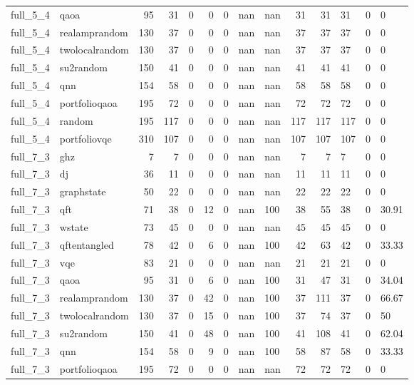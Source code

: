 \begin{longtable}{llrrrrlllrrlll}
full\_5\_4 & qaoa & 95 & 31 & 0 & 0 & 0 & nan & nan & 31 & 31 & 31 & 0 & 0 \\
full\_5\_4 & realamprandom & 130 & 37 & 0 & 0 & 0 & nan & nan & 37 & 37 & 37 & 0 & 0 \\
full\_5\_4 & twolocalrandom & 130 & 37 & 0 & 0 & 0 & nan & nan & 37 & 37 & 37 & 0 & 0 \\
full\_5\_4 & su2random & 150 & 41 & 0 & 0 & 0 & nan & nan & 41 & 41 & 41 & 0 & 0 \\
full\_5\_4 & qnn & 154 & 58 & 0 & 0 & 0 & nan & nan & 58 & 58 & 58 & 0 & 0 \\
full\_5\_4 & portfolioqaoa & 195 & 72 & 0 & 0 & 0 & nan & nan & 72 & 72 & 72 & 0 & 0 \\
full\_5\_4 & random & 195 & 117 & 0 & 0 & 0 & nan & nan & 117 & 117 & 117 & 0 & 0 \\
full\_5\_4 & portfoliovqe & 310 & 107 & 0 & 0 & 0 & nan & nan & 107 & 107 & 107 & 0 & 0 \\
full\_7\_3 & ghz & 7 & 7 & 0 & 0 & 0 & nan & nan & 7 & 7 & 7 & 0 & 0 \\
full\_7\_3 & dj & 36 & 11 & 0 & 0 & 0 & nan & nan & 11 & 11 & 11 & 0 & 0 \\
full\_7\_3 & graphstate & 50 & 22 & 0 & 0 & 0 & nan & nan & 22 & 22 & 22 & 0 & 0 \\
full\_7\_3 & qft & 71 & 38 & 0 & 12 & 0 & nan & 100 & 38 & 55 & 38 & 0 & 30.91 \\
full\_7\_3 & wstate & 73 & 45 & 0 & 0 & 0 & nan & nan & 45 & 45 & 45 & 0 & 0 \\
full\_7\_3 & qftentangled & 78 & 42 & 0 & 6 & 0 & nan & 100 & 42 & 63 & 42 & 0 & 33.33 \\
full\_7\_3 & vqe & 83 & 21 & 0 & 0 & 0 & nan & nan & 21 & 21 & 21 & 0 & 0 \\
full\_7\_3 & qaoa & 95 & 31 & 0 & 6 & 0 & nan & 100 & 31 & 47 & 31 & 0 & 34.04 \\
full\_7\_3 & realamprandom & 130 & 37 & 0 & 42 & 0 & nan & 100 & 37 & 111 & 37 & 0 & 66.67 \\
full\_7\_3 & twolocalrandom & 130 & 37 & 0 & 15 & 0 & nan & 100 & 37 & 74 & 37 & 0 & 50 \\
full\_7\_3 & su2random & 150 & 41 & 0 & 48 & 0 & nan & 100 & 41 & 108 & 41 & 0 & 62.04 \\
full\_7\_3 & qnn & 154 & 58 & 0 & 9 & 0 & nan & 100 & 58 & 87 & 58 & 0 & 33.33 \\
full\_7\_3 & portfolioqaoa & 195 & 72 & 0 & 0 & 0 & nan & nan & 72 & 72 & 72 & 0 & 0 \\

\end{longtable}
